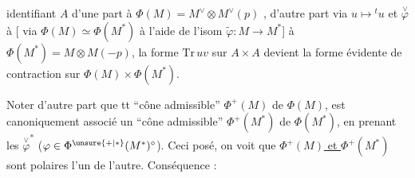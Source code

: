 identifiant $A$ d'une part à
$\Phi(M)=M^\vee\otimes M^\vee(p)$ , d'autre part via
\deleted{\unsure{$\varphi$}} $u\mapsto{}^tu$ et $\overset{\vee}{\varphi}$ à [ via $\Phi(M)\simeq\Phi(M^{*})$
à l'aide de l'isom $\widetilde\varphi:M\longrightarrow M^*$] à
$\Phi(M^*)=M\otimes M(-p)$, la forme $\mathrm{Tr}\,uv$
sur $A\times A$ devient la forme évidente
de contraction sur $\Phi(M)\times\Phi(M^*)$.

Noter d'autre part que   tt ``cône
 admissible'' $\Phi^+(M)$ de $\Phi(M)$,
est canoniquement associé un ``cône admissible''
$\Phi^+(M^*)$ de $\Phi(M^*)$, en prenant les
$\overset{\vee}{\varphi}^*$ ($\varphi\in\Phi^{\unsure{+|*}}(M^*)^\circ$). Ceci posé, on voit
que \uline{$\Phi^+(M)$ et $\Phi^+(M^*)$} sont
polaires l'un de l'autre. Conséquence :
